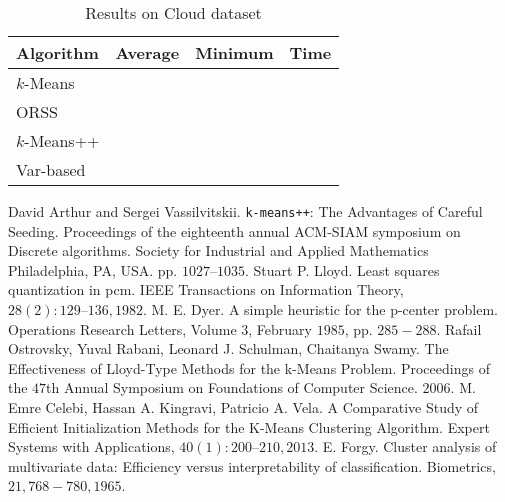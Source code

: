 \documentclass[10pt, leqno]{article}
\begin{document}
		\begin{table}[h]
			\begin{center}
				\begin{tabular}{|l|l|l|l|}
					\hline
					Algorithm & Average & Minimum & Time\\\hline
					$k$-Means &  & & \\\hline
					ORSS &  & & \\\hline
					$k$-Means++ & & & \\\hline
					Var-based & & & \\\hline
				\end{tabular}
				\caption{Results on Cloud dataset}
			\end{center}
			\label{tbl:mall}
		\end{table}	
	\begin{thebibliography}{99}
		 David Arthur and Sergei Vassilvitskii. \texttt{k-means++}: The Advantages of Careful Seeding. Proceedings of the eighteenth annual ACM-SIAM symposium on Discrete algorithms. Society for Industrial and Applied Mathematics Philadelphia, PA, USA. pp. $1027–1035$.
		 Stuart P. Lloyd. Least squares quantization in pcm. IEEE Transactions on Information Theory, $28(2):129–136, 1982$.
		 M. E. Dyer. A simple heuristic for the p-center problem. Operations Research Letters, Volume $3$, February $1985$, pp. $285-288$.
		 Rafail Ostrovsky, Yuval Rabani, Leonard J. Schulman, Chaitanya Swamy. The Effectiveness of Lloyd-Type Methods for the k-Means Problem. Proceedings of the $47$th Annual Symposium on Foundations of Computer Science. $2006$.
		 M. Emre Celebi, Hassan A. Kingravi, Patricio A. Vela. A Comparative Study of Efficient Initialization Methods for the K-Means Clustering Algorithm. Expert Systems with Applications, $40(1): 200–210, 2013$.
		 E. Forgy. Cluster analysis of multivariate data: Efficiency versus interpretability of classification. Biometrics, $21, 768-780, 1965$.
	\end{thebibliography}
\end{document}
